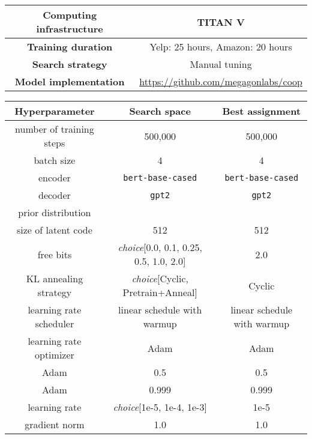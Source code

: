 \documentclass[11pt]{article}
\newcommand{\yelp}{\mbox{\bf Yelp}}
\newcommand{\amazon}{\mbox{\bf Amazon}}
\begin{document}
\begin{table*}[ht]
    \centering
    \small
    \begin{tabular}{cc}
        \toprule
       \textbf{Computing infrastructure} & TITAN V\\
       \midrule
       \textbf{Training duration} & Yelp: 25 hours, Amazon: 20 hours\\
       \midrule
       \textbf{Search strategy} & Manual tuning \\\midrule
       \textbf{Model implementation} & \url{https://github.com/megagonlabs/coop}\\
       \bottomrule
    \end{tabular}

    \vspace{3mm}\begin{tabular}{ccc}
    \toprule
    \textbf{Hyperparameter} & \textbf{Search space} & \textbf{Best assignment} \\
    \midrule
    number of training steps & 500,000 & 500,000\\
    \midrule
    batch size & 4 & 4\\
    \midrule
    encoder & \texttt{bert-base-cased} & \texttt{bert-base-cased} \\
    \midrule
    decoder & \texttt{gpt2} & \texttt{gpt2}\\
    \midrule
    prior distribution &  &  \\
    \midrule
    size of latent code & 512 & 512 \\
    \midrule
    free bits & \emph{choice}[0.0, 0.1, 0.25, 0.5, 1.0, 2.0] & 2.0\\
    \midrule
    KL annealing strategy & \emph{choice}[Cyclic, Pretrain+Anneal] & Cyclic\\
    \midrule
    learning rate scheduler & linear schedule with warmup & linear schedule with warmup\\
    \midrule
    learning rate optimizer & Adam & Adam\\
    \midrule
    Adam  & 0.5 & 0.5\\
    \midrule
    Adam  & 0.999 & 0.999\\
    \midrule
    learning rate & \emph{choice}[1e-5, 1e-4, 1e-3] & 1e-5 \\
    \midrule
    gradient norm & 1.0 & 1.0 \\
    \bottomrule
    \end{tabular}
    \caption{Optimus search space and the best assignments on \yelp{} and \amazon{} datasets.}
    \label{tab:optimus_param}
\end{table*}
 
\end{document}
